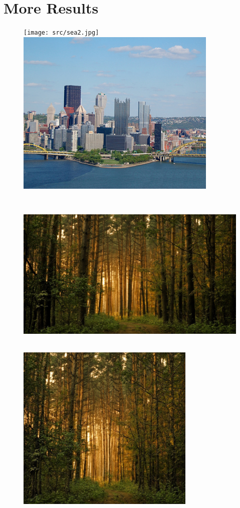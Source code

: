 
\section{More Results}
\begin{figure}[H]
\texttt{[image: src/sea2.jpg]}\\
\includegraphics[height=8cm]{result/sea2.png}
\centering
\end{figure}

\begin{figure}[H]
\includegraphics[height=8cm]{src/forest.jpg}\\
\includegraphics[height=8cm]{result/forest0.6.png}
\centering
\end{figure}

